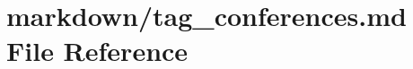 \hypertarget{tag__conferences_8md}{}\section{markdown/tag\+\_\+conferences.md File Reference}
\label{tag__conferences_8md}
